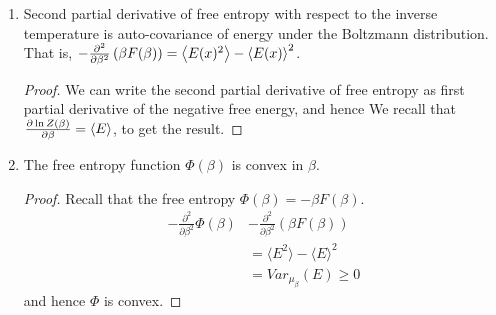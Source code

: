 \documentclass[letterpaper,english,10pt]{article}
\begin{document}
\begin{lem}
\begin{enumerate}
\begin{proof}
Therefore, we recognize that
\end{proof}
\item Second partial derivative of free entropy with respect to the inverse temperature is auto-covariance of energy under the Boltzmann distribution. 
That is, $-\frac{\partial ^2}{\partial \beta^2} \left( \beta F(\beta) \right)=\left\langle E(x)^2 \right\rangle-\left\langle E(x) \right\rangle^2$. 
\begin{proof} 
We can write the second partial derivative of free entropy as first partial derivative of the negative free energy, 
and hence 
We recall that $\frac{\partial \ln Z(\beta)}{\partial \beta} = \left\langle E\right\rangle$, to get the result.
\end{proof}
\item The free entropy function $\Phi(\beta)$ is convex in $\beta$.
\begin{proof}
Recall that the free entropy $\Phi(\beta) = -\beta F(\beta)$. 
\begin{align*}
- \frac{\partial^2}{\partial \beta^2} \Phi(\beta) & - \frac{\partial^2}{\partial \beta^2} (\beta F(\beta)) \\
	&= \langle E^2 \rangle - \langle E \rangle^2 \\
	&= Var_{\mu_\beta}(E) \geq 0
\end{align*}
and hence $\Phi$ is convex.
\end{proof}
\end{enumerate}
\end{lem}
\end{document}
